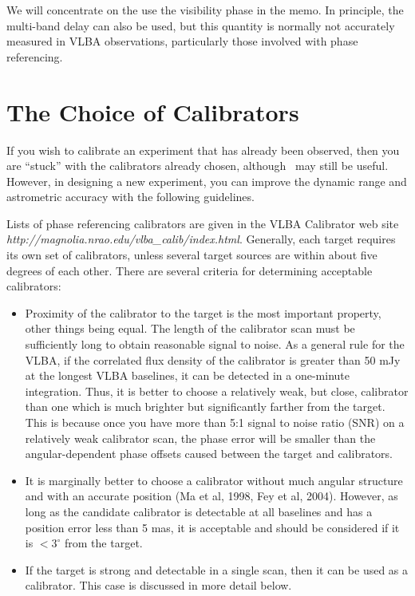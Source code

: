      We will concentrate on the use the visibility phase in the memo.
In principle, the multi-band delay can also be used, but this quantity
is normally not accurately measured in VLBA observations, particularly
those involved with phase referencing.

\section {The Choice of Calibrators}

     If you wish to calibrate an experiment that has already been
observed, then you are ``stuck'' with the calibrators already chosen,
although \ATMCA~may still be useful.  However, in designing a new
experiment, you can improve the dynamic range and astrometric accuracy
with the following guidelines.

     Lists of phase referencing calibrators are given in the VLBA
Calibrator web site {\it
http://magnolia.nrao.edu/vlba\_calib/index.html}.  Generally, each
target requires its own set of calibrators, unless several target
sources are within about five degrees of each other.  There are
several criteria for determining acceptable calibrators:
\begin{itemize}

\item Proximity of the calibrator to the target is the most important
property, other things being equal.  The length of the calibrator scan
must be sufficiently long to obtain reasonable signal to noise. As a
general rule for the VLBA, if the correlated flux density of the
calibrator is greater than 50 mJy at the longest VLBA baselines, it
can be detected in a one-minute integration.  Thus, it is better to
choose a relatively weak, but close, calibrator than one which is much
brighter but significantly farther from the target.  This is because
once you have more than 5:1 signal to noise ratio (SNR) on a
relatively weak calibrator scan, the phase error will be smaller than
the angular-dependent phase offsets caused between the target and
calibrators.

\item It is marginally better to choose a calibrator without much
angular structure and with an accurate position (Ma et al, 1998, Fey
et al, 2004).  However, as long as the candidate calibrator is
detectable at all baselines and has a position error less than 5 mas,
it is acceptable and should be considered if it is $<3^\circ$ from the
target.

\item If the target is strong and detectable in a single scan, then it
can be used as a calibrator.  This case is discussed in more detail
below.

\end{itemize}

